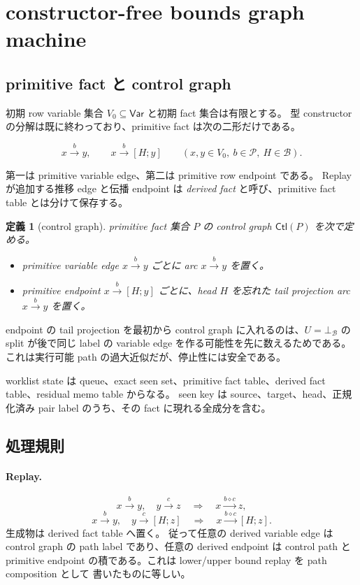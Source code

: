 \documentclass[uplatex,dvipdfmx,a4paper,10.5pt]{jsarticle}
\theoremstyle{jpplain}
\newtheorem{definition}{定義}[section]
\newcommand{\Caps}{\mathcal B}
\newcommand{\Var}{\mathsf{Var}}
\newcommand{\botc}{\bot_{\Caps}}
\newcommand{\Pair}{\mathcal P}
\newcommand{\pcomp}{\mathbin{\diamond}}
\newcommand{\edge}[3]{#1\xrightarrow{#2}#3}
\newcommand{\epedge}[4]{#1\xrightarrow{#2}[#3;#4]}
\begin{document}
\section{constructor-free bounds graph machine}

\subsection{primitive fact と control graph}

初期 row variable 集合 $V_0\subseteq\Var$ と初期 fact 集合は有限とする。
型 constructor の分解は既に終わっており、primitive fact は次の二形だけである。

\[
  \edge{x}{b}{y},
  \qquad
  \epedge{x}{b}{H}{y}
  \qquad
  (x,y\in V_0,\ b\in\Pair,\ H\in\Caps).
\]

第一は primitive variable edge、第二は primitive row endpoint である。
Replay が追加する推移 edge と伝播 endpoint は \emph{derived fact} と呼び、primitive fact table とは分けて保存する。

\begin{definition}[control graph]
primitive fact 集合 $P$ の control graph $\mathsf{Ctl}(P)$ を次で定める。

\begin{itemize}
  \item primitive variable edge $\edge{x}{b}{y}$ ごとに arc $\edge{x}{b}{y}$ を置く。
  \item primitive endpoint $\epedge{x}{b}{H}{y}$ ごとに、head $H$ を忘れた tail projection arc
  $\edge{x}{b}{y}$ を置く。
\end{itemize}
\end{definition}

endpoint の tail projection を最初から control graph に入れるのは、$U=\botc$ の split が後で同じ label の
variable edge を作る可能性を先に数えるためである。これは実行可能 path の過大近似だが、停止性には安全である。

worklist state は queue、exact seen set、primitive fact table、derived fact table、residual memo table からなる。
seen key は source、target、head、正規化済み pair label のうち、その fact に現れる全成分を含む。

\subsection{処理規則}

\paragraph{Replay.}
\[
  \edge{x}{b}{y},\quad \edge{y}{c}{z}
  \quad\Longrightarrow\quad
  \edge{x}{b\pcomp c}{z},
\]
\[
  \edge{x}{b}{y},\quad \epedge{y}{c}{H}{z}
  \quad\Longrightarrow\quad
  \epedge{x}{b\pcomp c}{H}{z}.
\]
生成物は derived fact table へ置く。
従って任意の derived variable edge は control graph の path label であり、任意の derived endpoint は
control path と primitive endpoint の積である。これは lower/upper bound replay を path composition として
書いたものに等しい。
\end{document}
